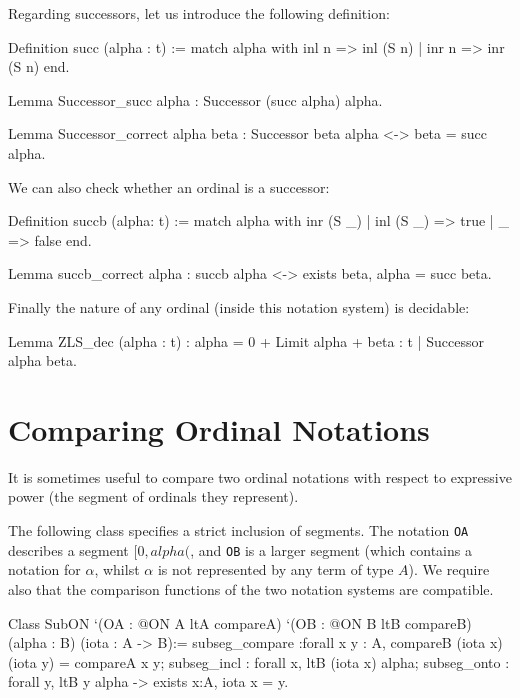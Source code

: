 Regarding successors, let us introduce the following definition:

\begin{Coqsrc}
Definition succ (alpha : t) :=
  match alpha with
    inl n => inl (S n)
  | inr n => inr (S n)
  end.
\end{Coqsrc}


\begin{Coqsrc}
Lemma Successor_succ alpha : Successor (succ alpha) alpha.

Lemma Successor_correct alpha beta : Successor beta alpha <->
                                     beta = succ alpha.
\end{Coqsrc}

We can also check whether an ordinal is a successor:

\begin{Coqsrc}
Definition succb (alpha: t) := match alpha with
                                   inr (S  _) | inl (S _) => true
                                 | _ => false
                                 end.

Lemma succb_correct alpha : succb alpha <-> exists beta,  alpha = succ beta.
\end{Coqsrc}


Finally the nature of any ordinal (inside this notation system) is decidable:

\begin{Coqsrc}
Lemma ZLS_dec (alpha : t) :
  {alpha = 0} +
  {Limit alpha} +
  {beta : t | Successor alpha beta}.
\end{Coqsrc}


\section{Comparing Ordinal Notations}

It is sometimes useful to compare two ordinal notations with respect to expressive power
(the segment of ordinals  they represent). 

The following class specifies a strict inclusion of segments. The notation \texttt{OA} describes a segment $[0,alpha($, and \texttt{OB} is a larger segment (which contains a notation for $\alpha$, whilst $\alpha$ is not represented by any term of type $A$). We require also  that the comparison functions of the two notation systems are compatible.

\begin{Coqsrc}
Class  SubON 
       `(OA : @ON A ltA  compareA)
       `(OB : @ON B ltB  compareB)
       (alpha :  B)
       (iota : A -> B):=
  {
  subseg_compare :forall x y : A,  compareB (iota x) (iota y) =
                                 compareA x y;
  subseg_incl : forall x, ltB (iota x) alpha;
  subseg_onto : forall y, ltB y alpha  -> exists x:A, iota x = y}.
\end{Coqsrc}

